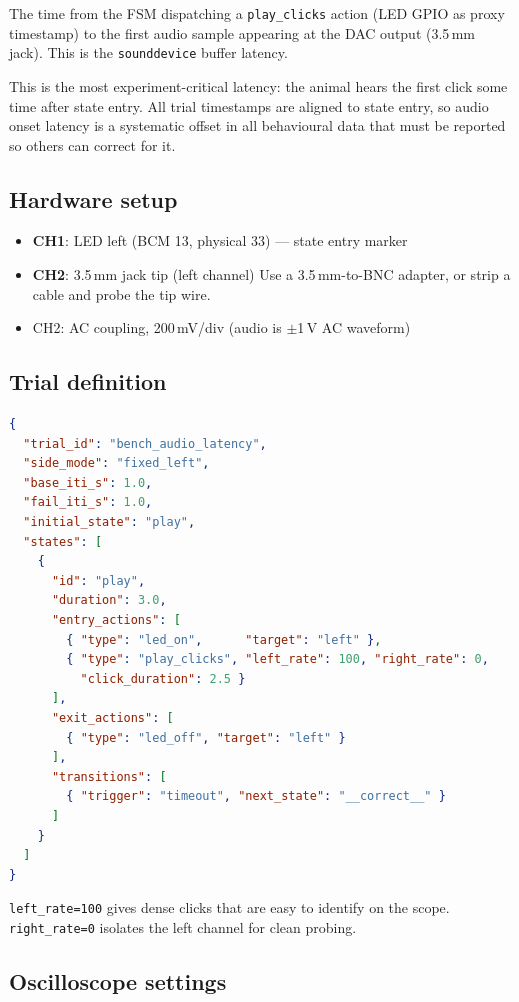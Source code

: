 \documentclass[11pt, a4paper]{article}
\begin{document}
The time from the FSM dispatching a \texttt{play\_clicks} action (LED GPIO as
proxy timestamp) to the first audio sample appearing at the DAC output
(3.5\,mm jack). This is the \texttt{sounddevice} buffer latency.

This is the most experiment-critical latency: the animal hears the first click
some time after state entry. All trial timestamps are aligned to state entry,
so audio onset latency is a systematic offset in all behavioural data that
must be reported so others can correct for it.

\subsection*{Hardware setup}

\begin{itemize}[noitemsep]
    \item \textbf{CH1}: LED left (BCM 13, physical 33) --- state entry marker
    \item \textbf{CH2}: 3.5\,mm jack tip (left channel)
          Use a 3.5\,mm-to-BNC adapter, or strip a cable and probe the tip wire.
    \item CH2: AC coupling, 200\,mV/div (audio is $\pm$1\,V AC waveform)
\end{itemize}

\subsection*{Trial definition}

\begin{lstlisting}[language=json]
{
  "trial_id": "bench_audio_latency",
  "side_mode": "fixed_left",
  "base_iti_s": 1.0,
  "fail_iti_s": 1.0,
  "initial_state": "play",
  "states": [
    {
      "id": "play",
      "duration": 3.0,
      "entry_actions": [
        { "type": "led_on",      "target": "left" },
        { "type": "play_clicks", "left_rate": 100, "right_rate": 0,
          "click_duration": 2.5 }
      ],
      "exit_actions": [
        { "type": "led_off", "target": "left" }
      ],
      "transitions": [
        { "trigger": "timeout", "next_state": "__correct__" }
      ]
    }
  ]
}
\end{lstlisting}

\texttt{left\_rate=100} gives dense clicks that are easy to identify on the
scope. \texttt{right\_rate=0} isolates the left channel for clean probing.

\subsection*{Oscilloscope settings}
\end{document}
